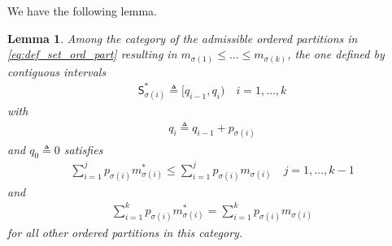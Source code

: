 \documentclass[conference]{IEEEtran}
\newtheorem{lemma}{Lemma}
\def\sS{{\mathsf S}}
\def\deq{\triangleq}
\begin{document}
We have the following lemma.
\begin{lemma}\label{lm:major}
Among the category of the admissible ordered partitions in \eqref{eq:def_set_ord_part} resulting in $m_{\sigma(1)} \le \ldots \le m_{\sigma(k)}$, the one defined by contiguous intervals
\begin{align}
    \sS^*_{\sigma(i)} \deq [q_{i-1}, q_i)  \quad i=1,\ldots,k \label{eq:def_S*_q}
\end{align}
with
\begin{align}
    q_i \deq q_{i-1} + p_{\sigma(i)}
\end{align}
and $q_0 \deq 0$ satisfies
\begin{align}
    \sum_{i=1}^j p_{\sigma(i)} m^*_{\sigma(i)}
    \le
    \sum_{i=1}^j p_{\sigma(i)} m_{\sigma(i)} \quad j=1,\ldots, k-1 \label{eq:major_j}
\end{align}
and 
\begin{align}
    \sum_{i=1}^k p_{\sigma(i)} m^*_{\sigma(i)}
    =
    \sum_{i=1}^k p_{\sigma(i)} m_{\sigma(i)} \label{eq:major_k}
\end{align}
for all other ordered partitions in this category.
\end{lemma}
\end{document}
